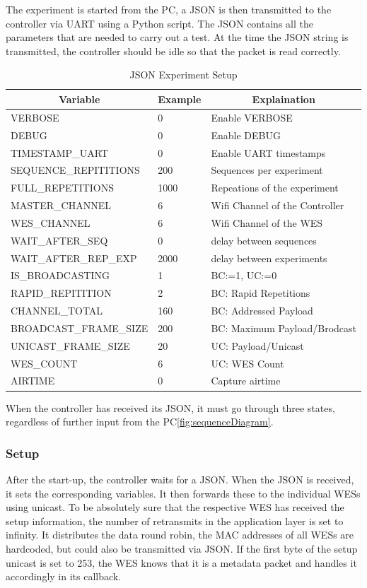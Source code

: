 The experiment is started from the PC, a JSON is then transmitted to the controller via \ac{UART} using a Python script.
The JSON contains all the parameters that are needed to carry out a test.
At the time the JSON string is transmitted, the controller should be idle so that the packet is read correctly.

\begin{table}[h]
	\centering
	\begin{tabular} { lll }
	\toprule
	\multicolumn{1}{c}{Variable}
	& \multicolumn{1}{c}{Example}
	& \multicolumn{1}{c}{Explaination} \\
	\midrule
	VERBOSE               & 0 				& Enable VERBOSE \\
	DEBUG                 & 0 				& Enable DEBUG \\
	TIMESTAMP\_UART       & 0				& Enable UART timestamps \\
	SEQUENCE\_REPITITIONS & 200				& Sequences per experiment \\
	FULL\_REPETITIONS     & 1000			& Repeations of the experiment \\
	MASTER\_CHANNEL       & 6				& Wifi Channel of the Controller \\
	WES\_CHANNEL          & 6				& Wifi Channel of the WES \\
	WAIT\_AFTER\_SEQ      & 0				& delay between sequences \\
	WAIT\_AFTER\_REP\_EXP & 2000			& delay between experiments \\
	IS\_BROADCASTING      & 1				& BC:=1, UC:=0 \\
	RAPID\_REPITITION     & 2				& BC: Rapid Repetitions \\
	CHANNEL\_TOTAL        & 160	 			& BC: Addressed Payload \\
	BROADCAST\_FRAME\_SIZE& 200 			& BC: Maximum Payload/Brodcast \\
	UNICAST\_FRAME\_SIZE  & 20				& UC: Payload/Unicast \\
	WES\_COUNT            & 6				& UC: WES Count \\
	AIRTIME               & 0				& Capture airtime\\
	\bottomrule
	\end{tabular}
	\caption{JSON Experiment Setup}
	\label{tab:json}
\end{table}

When the controller has received its JSON, it must go through three states, regardless of further input from the PC\cref{fig:sequenceDiagram}.
\subsubsection*{Setup}
After the start-up, the controller waits for a JSON. When the JSON is received, it sets the corresponding variables.
It then forwards these to the individual WESs using unicast. 
To be absolutely sure that the respective WES has received the setup information,
the number of retransmits in the application layer is set to infinity.
It distributes the data round robin, the MAC addresses of all WESs are hardcoded, but could also be transmitted via JSON.
If the first byte of the setup unicast is set to 253, the WES knows that it is a metadata packet and handles it accordingly in its callback.
